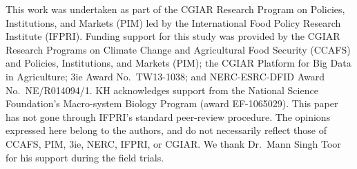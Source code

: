 \documentclass[, manuscript]{copernicus}
\begin{document}





\begin{acknowledgements}
This work was undertaken as part of the CGIAR Research Program on
Policies, Institutions, and Markets (PIM) led by the International Food
Policy Research Institute (IFPRI). Funding support for this study was
provided by the CGIAR Research Programs on Climate Change and
Agricultural Food Security (CCAFS) and Policies, Institutions, and
Markets (PIM); the CGIAR Platform for Big Data in Agriculture; 3ie Award
No.~TW13-1038; and NERC-ESRC-DFID Award No.~NE/R014094/1. KH
acknowledges support from the National Science Foundation's Macro-system
Biology Program (award EF-1065029). This paper has not gone through
IFPRI's standard peer-review procedure. The opinions expressed here
belong to the authors, and do not necessarily reflect those of CCAFS,
PIM, 3ie, NERC, IFPRI, or CGIAR. We thank Dr.~Mann Singh Toor for his
support during the field trials.
\end{acknowledgements}







\end{document}

